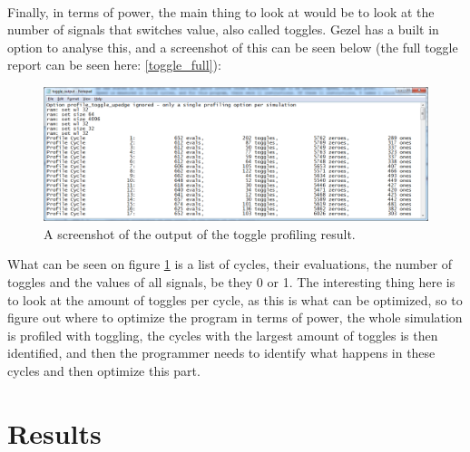 \documentclass[12pt,a4paper]{article}
\begin{document}
	\\
	Finally, in terms of power, the main thing to look at would be to look at the number of signals that switches value, also called toggles. Gezel has a built in option to analyse this, and a screenshot of this can be seen below (the full toggle report can be seen here: \ref{toggle_full}):\\
	\begin{figure}[h!]
		\centering
			\includegraphics[width=1\textwidth]{Screenshots/Screenshot_profiling.png}
		\caption{A screenshot of the output of the toggle profiling result.}
		\label{toggle}
	\end{figure}
	
	What can be seen on figure \ref{toggle} is a list of cycles, their evaluations, the number of toggles and the values of all signals, be they 0 or 1. The interesting thing here is to look at the amount of toggles per cycle, as this is what can be optimized, so to figure out where to optimize the program in terms of power, the whole simulation is profiled with toggling, the cycles with the largest amount of toggles is then identified, and then the programmer needs to identify what happens in these cycles and then optimize this part.\\


\section{Results}
	
\end{document}
